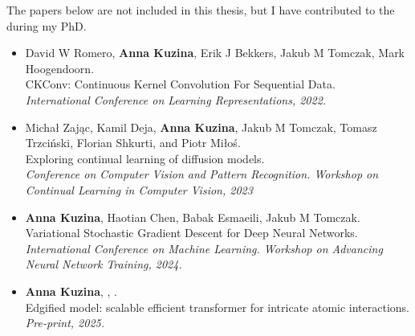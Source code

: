 The papers below are not included in this thesis, but I have contributed to the during my PhD.
\begin{itemize}[leftmargin=20pt, rightmargin=10pt]
    \item David W Romero, \textbf{Anna Kuzina}, Erik J Bekkers, Jakub M Tomczak, Mark Hoogendoorn. \\
    CKConv: Continuous Kernel Convolution For Sequential Data. \\
    \textit{International Conference on Learning Representations, 2022.}
     \item Michał Zając, Kamil Deja, \textbf{Anna Kuzina}, Jakub M Tomczak, Tomasz Trzciński, Florian Shkurti, and Piotr Miłoś. \\
     Exploring continual learning of diffusion models. \\
     \textit{Conference on Computer Vision and Pattern Recognition. Workshop on Continual Learning in Computer Vision, 2023}
    \item \textbf{Anna Kuzina}\footnotemark[1], Haotian Chen\footnotemark[1], Babak Esmaeili, Jakub M Tomczak. \\
    Variational Stochastic Gradient Descent for Deep Neural Networks. \\
    \textit{International Conference on Machine Learning. Workshop on Advancing Neural Network Training, 2024.}
    \item \textbf{Anna Kuzina}\footnotemark[1], \footnotemark[1], . \\
    Edgified model: scalable efficient transformer for intricate atomic interactions. \\
    \textit{Pre-print, 2025.}
\end{itemize}